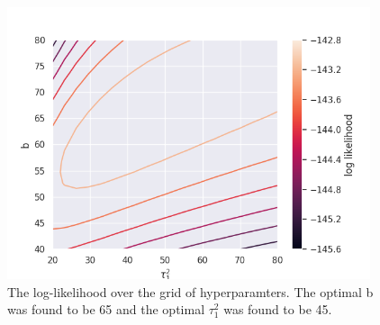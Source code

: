 \documentclass[10pt]{article}
\begin{document}
\begin{enumerate}[label=(\Alph*)]
    
    \begin{figure}[htb] \centering
    \includegraphics[width=0.95\textwidth]{./contour.png}
    \caption{The log-likelihood over the grid of hyperparamters. The optimal b was found to be 65 and the optimal $\tau_1^2$ was found to be 45.}
    \label{fig:contour}
    \end{figure}
    
    
    
    
    
    
    
    \end{enumerate}
\end{document}
